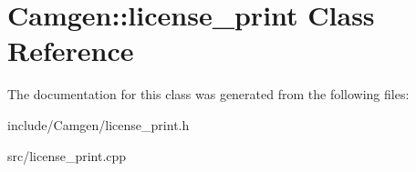 \hypertarget{a00324}{\section{Camgen\-:\-:license\-\_\-print Class Reference}
\label{a00324}
}


The documentation for this class was generated from the following files\-:\begin{DoxyCompactItemize}
\item 
include/\-Camgen/license\-\_\-print.\-h\item 
src/license\-\_\-print.\-cpp\end{DoxyCompactItemize}
